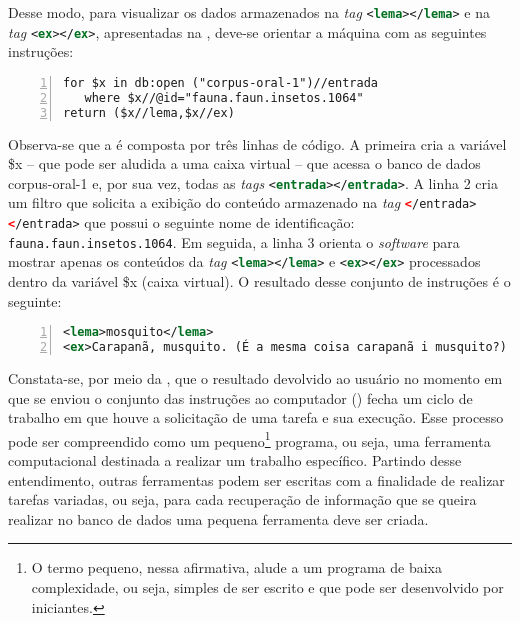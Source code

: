 \documentclass[portuguese]{textolivre}
\begin{document}
Desse modo, para visualizar os dados armazenados na \emph{tag} \lstinline[language=XML]!<lema></lema>! e na \emph{tag} \lstinline[language=XML]!<ex></ex>!, apresentadas na , deve-se orientar a máquina com as seguintes instruções:

\begin{lstlisting}[language=XQuery, label=tab02, caption={Instruções para recuperação de dados de uma entrada específica.}, source={Elaboração do autor.}, numbers=left]
for $x in db:open ("corpus-oral-1")//entrada
   where $x//@id="fauna.faun.insetos.1064"  
return ($x//lema,$x//ex)
\end{lstlisting} %


Observa-se que a  é composta por três linhas de código. A primeira cria a variável \$x – que pode ser aludida a uma caixa virtual – que acessa o banco de dados corpus-oral-1 e, por sua vez, todas as \emph{tags} \lstinline[language=XML]!<entrada></entrada>!. A linha 2 cria um filtro que solicita a exibição do conteúdo armazenado na \emph{tag} \lstinline[language=XML]!</entrada></entrada>! que possui o seguinte nome de identificação: \lstinline[language=XML]!fauna.faun.insetos.1064!. Em seguida, a linha 3 orienta o \emph{software} para mostrar apenas os conteúdos da \emph{tag} \lstinline[language=XML]!<lema></lema>! e \lstinline[language=XML]!<ex></ex>! processados dentro da variável \$x (caixa virtual). O resultado desse conjunto de instruções é o seguinte:

\begin{lstlisting}[language=XML, label=tab03, caption={Resultados das instruções escritas na \Cref{tab02}}, source={Elaboração do autor.}, numbers=left]
<lema>mosquito</lema>
<ex>Carapanã, musquito. (É a mesma coisa carapanã i musquito?) É a mesma coisa. (É o mesmo bichinho?) É o mesmo bichinho.</ex>
\end{lstlisting} %

Constata-se, por meio da , que o resultado devolvido ao usuário no momento em que se enviou o conjunto das instruções ao computador () fecha um ciclo de trabalho em que houve a solicitação de uma tarefa e sua execução. Esse processo pode ser compreendido como um pequeno\footnote{O termo pequeno, nessa afirmativa, alude a um programa de baixa complexidade, ou seja, simples de ser escrito e que pode ser desenvolvido por iniciantes.} programa, ou seja, uma ferramenta computacional destinada a realizar um trabalho específico. Partindo desse entendimento, outras ferramentas podem ser escritas com a finalidade de realizar tarefas variadas, ou seja, para cada recuperação de informação que se queira realizar no banco de dados uma pequena ferramenta deve ser criada. 
\end{document}
